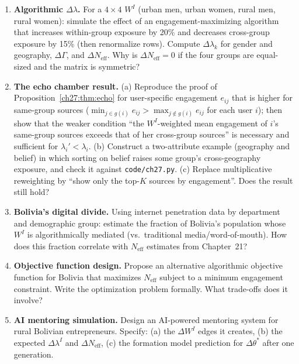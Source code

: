 \documentclass[../structural_economics_book.tex]{subfiles}
\begin{document}
\begin{enumerate}[label=\textbf{27.\arabic*}, leftmargin=3em]

\item \textbf{Algorithmic $\Delta\lambda$.} For a $4 \times 4$ $W^I$ (urban men, urban women, rural men, rural women): simulate the effect of an engagement-maximizing algorithm that increases within-group exposure by 20\% and decreases cross-group exposure by 15\% (then renormalize rows). Compute $\Delta\lambda_k$ for gender and geography, $\Delta\Gamma$, and $\Delta N_{\text{eff}}$. Why is $\Delta N_{\text{eff}} = 0$ if the four groups are equal-sized and the matrix is symmetric?

\item \textbf{The echo chamber result.} (a) Reproduce the proof of Proposition~\ref{ch27:thm:echo} for user-specific engagement $e_{ij}$ that is higher for same-group sources ($\min_{j \in g(i)} e_{ij} > \max_{j \notin g(i)} e_{ij}$ for each user $i$); then show that the weaker condition ``the $W^I$-weighted mean engagement of $i$'s same-group sources exceeds that of her cross-group sources'' is necessary and sufficient for $\lambda_i' < \lambda_i$. (b) Construct a two-attribute example (geography and belief) in which sorting on belief raises some group's cross-geography exposure, and check it against \texttt{code/ch27.py}. (c) Replace multiplicative reweighting by ``show only the top-$K$ sources by engagement''. Does the result still hold?

\item \textbf{Bolivia's digital divide.} Using internet penetration data by department and demographic group: estimate the fraction of Bolivia's population whose $W^I$ is algorithmically mediated (vs.\ traditional media/word-of-mouth). How does this fraction correlate with $N_{\text{eff}}$ estimates from Chapter~21?

\item \textbf{Objective function design.} Propose an alternative algorithmic objective function for Bolivia that maximizes $N_{\text{eff}}$ subject to a minimum engagement constraint. Write the optimization problem formally. What trade-offs does it involve?

\item \textbf{AI mentoring simulation.} Design an AI-powered mentoring system for rural Bolivian entrepreneurs. Specify: (a) the $\Delta W^I$ edges it creates, (b) the expected $\Delta\lambda^I$ and $\Delta N_{\text{eff}}$, (c) the formation model prediction for $\Delta\theta^*$ after one generation.


\end{enumerate}
\end{document}
